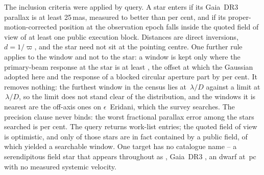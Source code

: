 The inclusion criteria were applied by query. A star enters
if its Gaia~DR3 parallax is at least 25\,mas, measured to better than
\PlxAdqlPct{} per cent, and if its proper-motion-corrected position at the
observation epoch falls inside the quoted field of view of at least one
public execution block. Distances are direct inversions, $d=1/\varpi$, and
the star need not sit at the pointing centre. One further rule applies to the
window and not to the star: a window is kept only where the primary-beam
response at the star is at least \BmFloorResp, the offset at which the
Gaussian adopted here and the response of a blocked circular aperture
part by \BmFloorTolPct{} per cent. It removes nothing: the furthest window in
the census lies at \BmCensusWorstC\,$\lambda/D$ against a limit at
\BmFloorC\,$\lambda/D$, so the limit does not stand clear of the distribution,
and the windows it is nearest are the \BmEpsNCensusOff{} off-axis ones on
$\epsilon$~Eridani, which the survey searches.
The precision clause never binds: the worst fractional parallax
error among the stars searched is \SfPlxWorstPct{} per cent. The query returns
\NCensus{} work-list entries; the quoted field of view is optimistic, and
only \NGenuinelyCovered{} of those stars are in fact contained by a public
field, of which \NStars{} yielded a searchable window. One target has no
catalogue name -- a serendipitous field star that appears throughout as
\BkAlmaName, Gaia~DR3 \BkAlmaGaia, an \BkAlmaSpType{} dwarf at
\BkAlmaDistPc\,pc with no measured systemic velocity.

